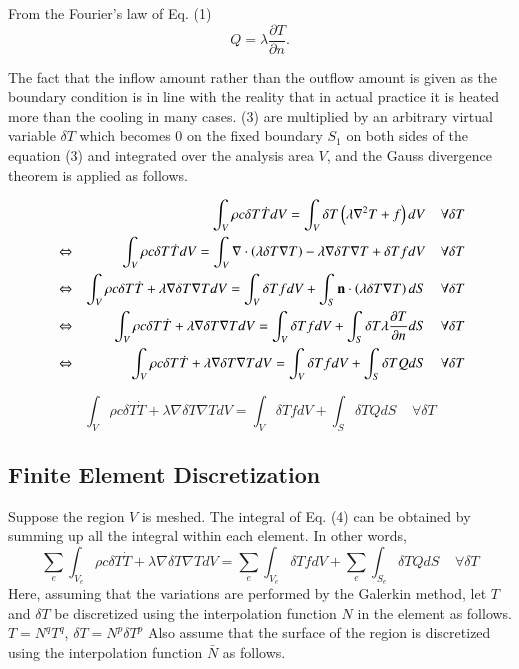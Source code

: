 From the Fourier's law of Eq. (1)
%
\begin{equation}
Q=\lambda\frac{\partial T}{\partial n}.
\end{equation}

The fact that the inflow amount rather than the outflow amount is given as the boundary condition is in line with the reality that in actual practice it is heated more than the cooling in many cases.
%
(3) are multiplied by an arbitrary virtual variable $\delta T$ which becomes 0 on the fixed boundary $S_1$ on both sides of the equation (3) and integrated over the analysis area $V$, and the Gauss divergence theorem is applied as follows.

\begin{eqnarray}
&&\int_V \rho c \delta T\dot{T} dV = \int_V \delta T\left(\lambda \nabla^2 T + f \right)dV\;\;\;\;\forall\delta T \\      
&\Leftrightarrow& \int_V \rho c \delta T \dot{T} dV= \int_V  \nabla\cdot\left( \lambda\delta T \nabla T\right) - \lambda\nabla\delta T\nabla T+ \delta T f dV\;\;\;\;\forall\delta T\\     
&\Leftrightarrow& \int_V \rho c \delta T\dot{T}  + \lambda\nabla\delta T\nabla TdV= \int_V \delta T f dV + \int_S  \mathbf{n}\cdot\left( \lambda\delta T \nabla T\right) dS\;\;\;\;\forall\delta T\\    
&\Leftrightarrow& \int_V \rho c \delta T\dot{T}  + \lambda\nabla\delta T\nabla TdV= \int_V \delta T f dV + \int_S  \delta T \lambda\frac{\partial T}{\partial n} dS\;\;\;\;\forall\delta T\\     
&\Leftrightarrow& \int_V \rho c \delta T \dot{T}  + \lambda\nabla\delta T\nabla TdV= \int_V \delta T f dV + \int_S  \delta T Q dS\;\;\;\;\forall\delta T
\end{eqnarray}

\begin{tcolorbox}[title=Heat conduction equation of weak form]
\begin{equation}
\int_V\rho c \delta T\dot{T}  + \lambda\nabla\delta T\nabla TdV= \int_V \delta T f dV + \int_S  \delta T Q dS\;\;\;\;\forall\delta T
\end{equation}
\end{tcolorbox}



\subsection{Finite Element Discretization}
Suppose the region $V$ is meshed. The integral of Eq. (4) can be obtained by summing up all the integral within each element. In other words,
%
\begin{equation}
\sum_e\int_{V_e} \rho c \delta T\dot{T}  + \lambda\nabla\delta T\nabla TdV= \sum_e\int_{V_e} \delta T f dV + \sum_e\int_{S_e}  \delta T Q dS\;\;\;\;\forall\delta T
\end{equation}
%
Here, assuming that the variations are performed by the Galerkin method, let $T$ and $\delta T$ be discretized using the interpolation function $N$ in the element as follows.
$T = N^q T^q$, $\delta T = N^p \delta T^p$
Also assume that the surface of the region is discretized using the interpolation function $\bar{N}$ as follows.

